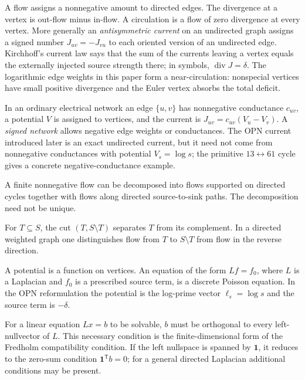 \documentclass[11pt]{article}
\theoremstyle{definition}
\theoremstyle{remark}
\newcommand{\one}{\mathbf{1}}
\begin{document}
\begin{description}[style=nextline,leftmargin=1.5em]
\item[Flow, circulation, divergence, and Kirchhoff law.]
A flow assigns a nonnegative amount to directed edges.  The divergence at a
vertex is out-flow minus in-flow.  A circulation is a flow of zero divergence
at every vertex.  More generally an \emph{antisymmetric current} on an
undirected graph assigns a signed number $J_{uv}=-J_{vu}$ to each oriented
version of an undirected edge.  Kirchhoff's current law says that the sum of
the currents leaving a vertex equals the externally injected source strength
there; in symbols, $\operatorname{div}J=\delta$.  The logarithmic edge weights
in this paper form a near-circulation: nonspecial vertices have small positive
divergence and the Euler vertex absorbs the total deficit.

\item[Conductance and signed network.]
In an ordinary electrical network an edge $\{u,v\}$ has nonnegative
conductance $c_{uv}$, a potential $V$ is assigned to vertices, and the current
is $J_{uv}=c_{uv}(V_u-V_v)$.  A \emph{signed network} allows negative edge
weights or conductances.  The OPN current introduced later is an exact
undirected current, but it need not come from nonnegative conductances with
potential $V_s=\log s$; the primitive $13\leftrightarrow61$ cycle gives a
concrete negative-conductance example.

\item[Flow decomposition.]
A finite nonnegative flow can be decomposed into flows supported on directed
cycles together with flows along directed source-to-sink paths.  The
decomposition need not be unique.

\item[Cut.]
For $T\subseteq S$, the cut $(T,S\setminus T)$ separates $T$ from its
complement.  In a directed weighted graph one distinguishes flow from $T$ to
$S\setminus T$ from flow in the reverse direction.

\item[Potential and Poisson equation.]
A potential is a function on vertices.  An equation of the form
$Lf=f_0$, where $L$ is a Laplacian and $f_0$ is a prescribed source term, is
a discrete Poisson equation.  In the OPN reformulation the potential is the
log-prime vector $\ell_s=\log s$ and the source term is $-\delta$.


\item[Fredholm compatibility condition.]
For a linear equation $Lx=b$ to be solvable, $b$ must be orthogonal to every
left-nullvector of $L$.  This necessary condition is the finite-dimensional
form of the Fredholm compatibility condition.  If the left nullspace is
spanned by $\one$, it reduces to the zero-sum condition
$\one^{\mathsf T}b=0$; for a general directed Laplacian additional
conditions may be present.


\end{description}
\end{document}
